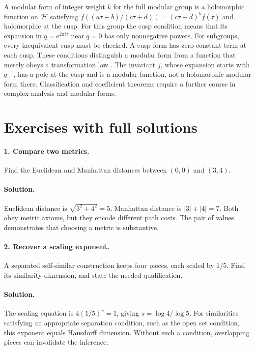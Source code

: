A modular form of integer weight $k$ for the full modular group is a
holomorphic function on $\mathcal H$ satisfying
$f((a\tau+b)/(c\tau+d))=(c\tau+d)^k f(\tau)$ and holomorphic at
the cusp. For this group the cusp condition means that its expansion in
$q=e^{2\pi i\tau}$ near $q=0$ has only nonnegative powers.
For subgroups, every inequivalent cusp must be checked. A cusp form has
zero constant term at each cusp. These conditions distinguish a modular
form from a function that merely obeys a transformation law
\citep{diamond2005first}. The invariant $j$, whose expansion starts with
$q^{-1}$, has a pole at the cusp and is a modular function, not a
holomorphic modular form there. Classification and coefficient theorems
require a further course in complex analysis and modular forms.

\section{Exercises with full solutions}
\paragraph{1. Compare two metrics.}
Find the Euclidean and Manhattan distances between $(0,0)$ and $(3,4)$.

\paragraph{Solution.}
Euclidean distance is $\sqrt{3^2+4^2}=5$. Manhattan distance is
$|3|+|4|=7$. Both obey metric axioms, but they encode different path costs.
The pair of values demonstrates that choosing a metric is substantive.

\paragraph{2. Recover a scaling exponent.}
A separated self-similar construction keeps four pieces, each scaled by
$1/5$. Find its similarity dimension, and state the needed qualification.

\paragraph{Solution.}
The scaling equation is $4(1/5)^s=1$, giving $s=\log4/\log5$.
For similarities satisfying an appropriate separation condition, such as
the open set condition, this exponent equals Hausdorff dimension. Without
such a condition, overlapping pieces can invalidate the inference.

